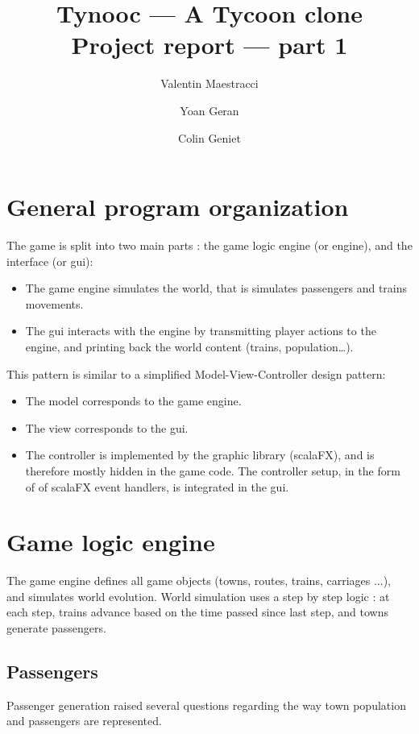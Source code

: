 \documentclass{article}
\begin{document}
\title{Tynooc --- A Tycoon clone \\ \large{Project report --- part 1}}
\author{Valentin Maestracci \and Yoan Geran \and Colin Geniet}
\maketitle

\tableofcontents

\section{General program organization}
The game is split into two main parts : the game logic engine (or engine), and the interface (or gui):
\begin{itemize}
\item The game engine simulates the world, that is simulates passengers and trains movements.
\item The gui interacts with the engine by transmitting player actions to the engine, 
and printing back the world content (trains, population\dots).
\end{itemize}

This pattern is similar to a simplified Model-View-Controller design pattern:
\begin{itemize}[noitemsep]
\item The model corresponds to the game engine.
\item The view corresponds to the gui.
\item The controller is implemented by the graphic library (scalaFX), and is therefore mostly hidden in the game code.
The controller setup, in the form of of scalaFX event handlers, is integrated in the gui.
\end{itemize}



\section{Game logic engine}
The game engine defines all game objects (towns, routes, trains, carriages ...), and simulates world evolution.
World simulation uses a step by step logic : at each step, trains advance based on the time passed since last step,
and towns generate passengers.

\subsection{Passengers}
Passenger generation raised several questions regarding the way town population and passengers are represented.
\end{document}
